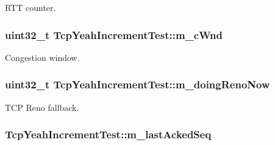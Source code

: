 R\+TT counter. 

\subsubsection[{\texorpdfstring{m\+\_\+c\+Wnd}{m_cWnd}}]{\setlength{\rightskip}{0pt plus 5cm}uint32\+\_\+t Tcp\+Yeah\+Increment\+Test\+::m\+\_\+c\+Wnd\hspace{0.3cm}{\ttfamily [private]}}\hypertarget{classTcpYeahIncrementTest_a3661dc763cb1315b447146422578f251}{}\label{classTcpYeahIncrementTest_a3661dc763cb1315b447146422578f251}


Congestion window. 

\subsubsection[{\texorpdfstring{m\+\_\+doing\+Reno\+Now}{m_doingRenoNow}}]{\setlength{\rightskip}{0pt plus 5cm}uint32\+\_\+t Tcp\+Yeah\+Increment\+Test\+::m\+\_\+doing\+Reno\+Now\hspace{0.3cm}{\ttfamily [private]}}\hypertarget{classTcpYeahIncrementTest_a6e13a25e0b54b55dc2b30303ef5db80f}{}\label{classTcpYeahIncrementTest_a6e13a25e0b54b55dc2b30303ef5db80f}


T\+CP Reno fallback. 

\subsubsection[{\texorpdfstring{m\+\_\+last\+Acked\+Seq}{m_lastAckedSeq}}]{ Tcp\+Yeah\+Increment\+Test\+::m\+\_\+last\+Acked\+Seq\hspace{0.3cm}{\ttfamily [private]}}\hypertarget{classTcpYeahIncrementTest_a7b14dd335b9a584c3f4379e5c0a795e4}{}\label{classTcpYeahIncrementTest_a7b14dd335b9a584c3f4379e5c0a795e4}


